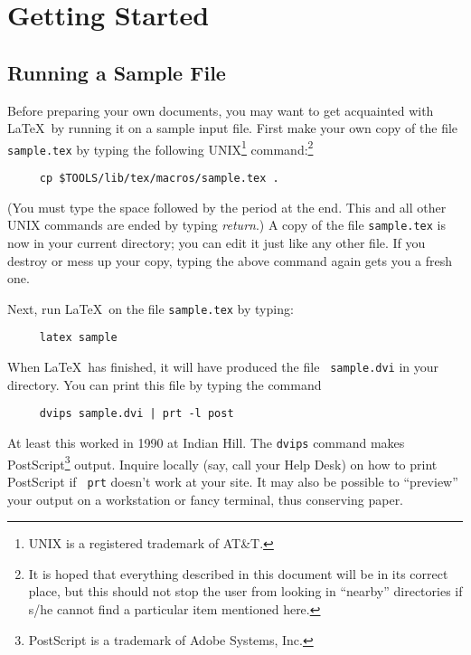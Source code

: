 \section{Getting Started}

\subsection{Running a Sample File} \label{sec:sample}

Before preparing your own documents, you may want to get acquainted
with \LaTeX\ by running it on a sample input file.  First make your own
copy of the file \mbox{\tt sample.tex} by typing the following
UNIX\footnote{ UNIX is a registered trademark of AT\&T.}
command:\footnote{It is hoped that everything described in this
document will be in its correct place, but this should not stop the
user from looking in ``nearby'' directories if s/he cannot find a
particular item mentioned here.
}
%
%

\begin{verbatim}
     cp $TOOLS/lib/tex/macros/sample.tex .
\end{verbatim}
(You must type the space followed by the period at the end.  This
and all other UNIX commands are ended by typing {\em return}.)
A copy of the file \mbox{\tt sample.tex} is now in your current
directory; you can edit it just like any other file.  If you destroy or
mess up your copy, typing the above command again gets you a fresh
one.

Next, run \LaTeX\ on the file \mbox{\tt sample.tex} by typing:
\begin{verbatim}
     latex sample
\end{verbatim}
When \LaTeX\ has finished, it will have produced the file \mbox{\tt
sample.dvi} in your directory.  You can print this file by typing the
command
\begin{verbatim}
     dvips sample.dvi | prt -l post
\end{verbatim}
At least this worked in 1990 at Indian Hill.  The {\tt dvips} command makes
PostScript\footnote{
PostScript is a trademark of Adobe Systems, Inc.
} output.  Inquire locally (say, call your Help Desk) on how to print
PostScript if {\tt
prt} doesn't work at your site.  It may also be possible to
``preview'' your output on a workstation or fancy terminal, thus
conserving
paper.

